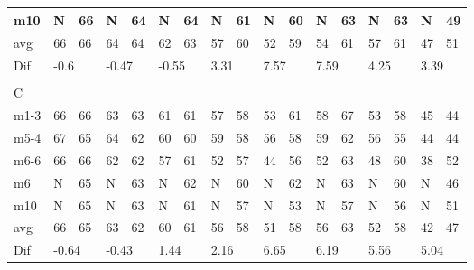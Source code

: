 \begin{table}[H]
\begin{tabular}{l|l|l|l|l|l|l|l|l|l|l|l|l|l|l|l|l}
m10  &   N  &     66    &   N    &   64    &     N      &     64      &    N     &     61       &    N     &       60     &      N     &       63     &        N   &       63     & N & 49 \\ \hline
avg       &      66 &   66     &      64    &  64     &    62         &     63       &      57      &   60    &     52       &    59        &    54        &      61      &      57      &     61       & 47 &51 \\ \hline
Dif & \multicolumn{2}{l|}{-0.6} & \multicolumn{2}{l|}{-0.47} & \multicolumn{2}{l|}{-0.55} & \multicolumn{2}{l|}{3.31} & \multicolumn{2}{l|}{7.57} & \multicolumn{2}{l|}{7.59}& \multicolumn{2}{l|}{4.25}& \multicolumn{2}{l}{3.39} \\
\multicolumn{17}{l}{ } \\   
C & \multicolumn{2}{l|}{} & \multicolumn{2}{l|}{} & \multicolumn{2}{l|}{} & \multicolumn{2}{l|}{} & \multicolumn{2}{l|}{} & \multicolumn{2}{l|}{}& \multicolumn{2}{l|}{}& \multicolumn{2}{l}{}     \\ \hline
m1-3   &   66  &      66      &    63  &   63         &   61   &     61       &  57   &      58      &  53   &  61   &  58   &      67      &   53   &      58      & 45 &44  \\
m5-4   &    67  &      65      &   64  &     62       &   60    &     60       &  59  &      58      &  56  &  58   &   59  &        62    &   56  &      55      & 44 &44  \\
m6-6   &    66   &     66       &  62  &     62       &    57   &      61      &  52   &       57     &   44  & 56   &   52   &      63      &   48 &       60     & 38 & 52 \\
m6   &   N    &     65       &  N  &    63        & N   &      62      &  N   &      60      & N & 62   &   N   &      63      &   N   &    60        & N & 46 \\
m10  &  N   &      65      &   N  &    63        &  N  &      61      &   N  &       57    &  N  &  53 &  N   &     57       &   N  &      56      & N &  51\\ \hline
avg      &   66    &      65      &     63   &     62      &      60&   61      &       56  &     58       &   51   &  58     &  56     &   63         &      52      &    58        & 42 &47 \\ \hline
Dif & \multicolumn{2}{l|}{-0.64} & \multicolumn{2}{l|}{-0.43} & \multicolumn{2}{l|}{1.44} & \multicolumn{2}{l|}{2.16} & \multicolumn{2}{l|}{6.65} & \multicolumn{2}{l|}{6.19}& \multicolumn{2}{l|}{5.56}& \multicolumn{2}{l}{5.04} \\

\end{tabular}
\end{table}
